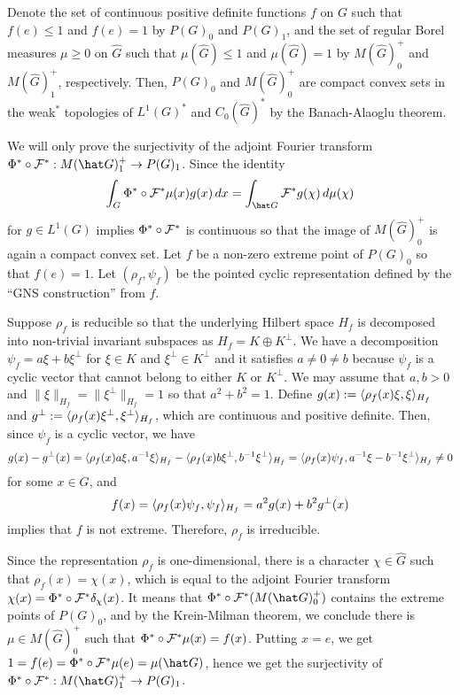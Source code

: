 \documentclass{../../small}
\begin{document}
\begin{pf}
Denote the set of continuous positive definite functions $f$ on $G$ such that $f(e)\le1$ and $f(e)=1$ by $P(G)_0$ and $P(G)_1$, and the set of regular Borel measures $\mu\ge0$ on $\hat G$ such that $\mu(\hat G)\le1$ and $\mu(\hat G)=1$ by $M(\hat G)_0^+$ and $M(\hat G)_1^+$, respectively.
Then, $P(G)_0$ and $M(\hat G)_0^+$ are compact convex sets in the weak$^*$ topologies of $L^1(G)^*$ and $C_0(\hat G)^*$ by the Banach-Alaoglu theorem.

We will only prove the surjectivity of the adjoint Fourier transform $\Phi^*\circ\cF^*:M(\hat G)_1^+\to P(G)_1$.
Since the identity
\[\int_G\Phi^*\circ\cF^*\mu(x)g(x)\,dx=\int_{\hat G}\cF^*g(\chi)\,d\mu(\chi)\]
for $g\in L^1(G)$ implies $\Phi^*\circ\mathcal{F}^*$ is continuous so that the image of $M(\hat G)_0^+$ is again a compact convex set.
Let $f$ be a non-zero extreme point of $P(G)_0$ so that $f(e)=1$.
Let $(\rho_f,\psi_f)$ be the pointed cyclic representation defined by the ``GNS construction'' from $f$.

Suppose $\rho_f$ is reducible so that the underlying Hilbert space $H_f$ is decomposed into non-trivial invariant subspaces as $H_f=K\oplus K^\perp$.
We have a decomposition $\psi_f=a\xi+b\xi^\perp$ for $\xi\in K$ and $\xi^\perp\in K^\perp$ and it satisfies $a\ne0\ne b$ because $\psi_f$ is a cyclic vector that cannot belong to either $K$ or $K^\perp$.
We may assume that $a,b>0$ and $\|\xi\|_{H_f}=\|\xi^\perp\|_{H_f}=1$ so that $a^2+b^2=1$.
Define $g(x):=\langle\rho_f(x)\xi,\xi\rangle_{H_f}$ and $g^\perp:=\langle\rho_f(x)\xi^\perp,\xi^\perp\rangle_{H_f}$, which are continuous and positive definite.
Then, since $\psi_f$ is a cyclic vector, we have
\[g(x)-g^\perp(x)=\langle\rho_f(x)a\xi,a^{-1}\xi\rangle_{H_f}-\langle\rho_f(x)b\xi^\perp,b^{-1}\xi^\perp\rangle_{H_f}=\langle\rho_f(x)\psi_f,a^{-1}\xi-b^{-1}\xi^\perp\rangle_{H_f}\ne0\]
for some $x\in G$, and
\[f(x)=\langle\rho_f(x)\psi_f,\psi_f\rangle_{H_f}=a^2g(x)+b^2g^\perp(x)\]
implies that $f$ is not extreme.
Therefore, $\rho_f$ is irreducible.

Since the representation $\rho_f$ is one-dimensional, there is a character $\chi\in\hat G$ such that $\rho_f(x)=\chi(x)$, which is equal to the adjoint Fourier transform $\chi(x)=\Phi^*\circ\mathcal{F}^*\delta_\chi(x)$.
It means that $\Phi^*\circ\cF^*(M(\hat G)_0^+)$ contains the extreme points of $P(G)_0$, and by the Krein-Milman theorem, we conclude there is $\mu\in M(\hat G)_0^+$ such that $\Phi^*\circ\mathcal{F}^*\mu(x)=f(x)$.
Putting $x=e$, we get $1=f(e)=\Phi^*\circ\cF^*\mu(e)=\mu(\hat G)$, hence we get the surjectivity of $\Phi^*\circ\cF^*:M(\hat G)_1^+\to P(G)_1$.
\end{pf}
\end{document}

